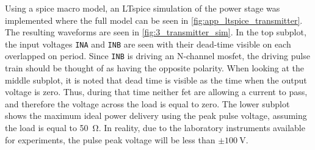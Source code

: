 Using a \gls{spice} macro model, an LTspice simulation of the power stage was implemented where the full model can be seen in \cref{fig:app_ltspice_transmitter}. The resulting waveforms are seen in \cref{fig:3_transmitter_sim}. In the top subplot, the input voltages \texttt{INA} and \texttt{INB} are seen with their dead-time visible on each overlapped on period. Since \texttt{INB} is driving an N-channel \gls{mosfet}, the driving pulse train should be thought of as having the opposite polarity. When looking at the middle subplot, it is noted that dead time is visible as the time when the output voltage is zero. Thus, during that time neither \gls{fet} are allowing a current to pass, and therefore the voltage across the load is equal to zero. The lower subplot shows the maximum ideal power delivery using the peak pulse voltage, assuming the load is equal to \qty{50}{\ohm}. In reality, due to the laboratory instruments available for experiments, the pulse peak voltage will be less than $\pm \qty{100}{\volt}$.

